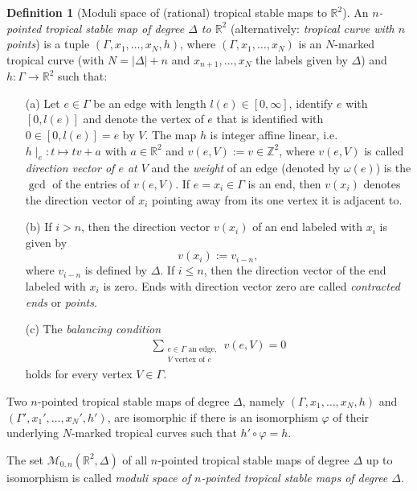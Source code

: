 \documentclass[11pt,reqno,a4]{amsart}
\theoremstyle{dotless}
\theoremstyle{definition}
\newtheorem{definition}[corollary]{Definition}
\begin{document}
\begin{definition}[Moduli space of (rational) tropical stable maps to $\mathbb{R}^2$]\label{definition:moduli_stable_maps}
An \textit{$n$-pointed tropical stable map of degree $\Delta$ to $\mathbb{R}^2$} (alternatively: \textit{tropical curve with $n$ points}) is a tuple $(\Gamma,x_1,\dots,x_N,h)$, where $(\Gamma,x_1,\dots,x_N)$ is an $N$-marked tropical curve (with $N=|\Delta|+n$ and $x_{n+1},\dots,x_{N}$ the labels given by $\Delta$) and $h:\Gamma\to\mathbb{R}^2$ such that:
\begin{itemize}
\item[(a)]
Let $e\in\Gamma$ be an edge with length $l(e)\in [0,\infty]$, identify $e$ with $[0,l(e)]$ and denote the vertex of $e$ that is identified with $0\in [0,l(e)]=e$ by $V$. The map $h$ is integer affine linear, i.e. $h\mid_e:t\mapsto tv+a$ with $a\in\mathbb{R}^2$ and $v(e,V):=v\in\mathbb{Z}^2$, where $v(e,V)$ is called \textit{direction vector of $e$ at $V$} and the \textit{weight} of an edge (denoted by $\omega(e)$) is the $\gcd$ of the entries of $v(e,V)$. If $e=x_i\in\Gamma$ is an end, then $v(x_i)$ denotes the direction vector of $x_i$ pointing away from its one vertex it is adjacent to.
\item[(b)]
If $i>n$, then the direction vector $v(x_i)$ of an end labeled with $x_i$ is given by 
$$v(x_i):=v_{i-n},$$ where $v_{i-n}$ is defined by $\Delta$. If $i\leq n$, then the direction vector of the end labeled with $x_i$ is zero. Ends with direction vector zero are called \textit{contracted ends} or \textit{points}.
\item[(c)]
The \textit{balancing condition}
\begin{align*}
\sum_{\substack{e\in\Gamma\textrm{ an edge}, \\ V \textrm{ vertex of }e}}v(e,V)=0
\end{align*}
holds for every vertex $V\in\Gamma$.
\end{itemize}
Two $n$-pointed tropical stable maps of degree $\Delta$, namely $(\Gamma ,x_1,\dots,x_N,h)$ and $(\Gamma' ,x_1', \dots, x_N',h')$, are isomorphic if there is an isomorphism $\varphi$ of their underlying $N$-marked tropical curves such that $h'\circ\varphi=h$.

\noindent The set $\mathcal{M}_{0,n}\left(\mathbb{R}^2,\Delta\right)$ of all $n$-pointed tropical stable maps of degree $\Delta$ up to isomorphism is called \textit{moduli space of $n$-pointed tropical stable maps of degree $\Delta$}.
\end{definition}
\end{document}
